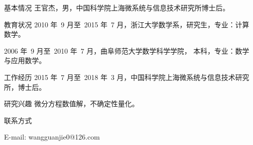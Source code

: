 
\begin{resume}

\begin{resumesection}{基本情况}
王官杰，男，中国科学院上海微系统与信息技术研究所博士后。
\end{resumesection}


\begin{resumelist}{教育状况}
2010 年~9 月至~2015 年~7
月，浙江大学数学系，研究生，专业：计算数学。
 
2006 年~9 月至~2010 年~7 月，曲阜师范大学数学科学学院，
本科，专业：数学与应用数学。
\end{resumelist}

\begin{resumelist}{工作经历}
 2015 年~7 月至~2018 年~3
 月，中国科学院上海微系统与信息技术研究所，博士后。
\end{resumelist}

\begin{resumelist}{研究兴趣}
微分方程数值解，不确定性量化。
\end{resumelist}

\begin{resumelist}{联系方式}

E-mail: wangguanjie0@126.com
\end{resumelist}

\end{resume}